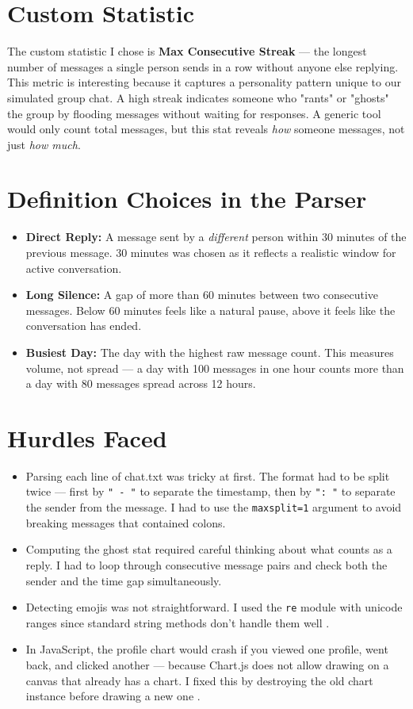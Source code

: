 \documentclass{report}
\begin{document}
\section{Custom Statistic}
The custom statistic I chose is \textbf{Max Consecutive Streak} — the longest number of messages a single person sends in a row without anyone else replying. This metric is interesting because it captures a personality pattern unique to our simulated group chat. A high streak indicates someone who "rants" or "ghosts" the group by flooding messages without waiting for responses. A generic tool would only count total messages, but this stat reveals \textit{how} someone messages, not just \textit{how much}.

\section{Definition Choices in the Parser}

\begin{itemize}
    \item \textbf{Direct Reply:} A message sent by a \textit{different} person within 30 minutes of the previous message. 30 minutes was chosen as it reflects a realistic window for active conversation.
    \item \textbf{Long Silence:} A gap of more than 60 minutes between two consecutive messages. Below 60 minutes feels like a natural pause, above it feels like the conversation has ended.
    \item \textbf{Busiest Day:} The day with the highest raw message count. This measures volume, not spread — a day with 100 messages in one hour counts more than a day with 80 messages spread across 12 hours.
\end{itemize}

\section{Hurdles Faced}

\begin{itemize}
    \item Parsing each line of chat.txt was tricky at first. The format had to be split twice — first by \texttt{" - "} to separate the timestamp, then by \texttt{": "} to separate the sender from the message. I had to use the \texttt{maxsplit=1} argument to avoid breaking messages that contained colons.
    \item Computing the ghost stat required careful thinking about what counts as a reply. I had to loop through consecutive message pairs and check both the sender and the time gap simultaneously.
    \item Detecting emojis was not straightforward. I used the \texttt{re} module with unicode ranges since standard string methods don't handle them well \cite{pythondocs}.
    \item In JavaScript, the profile chart would crash if you viewed one profile, went back, and clicked another — because Chart.js does not allow drawing on a canvas that already has a chart. I fixed this by destroying the old chart instance before drawing a new one \cite{mdn}.
\end{itemize}
\end{document}
